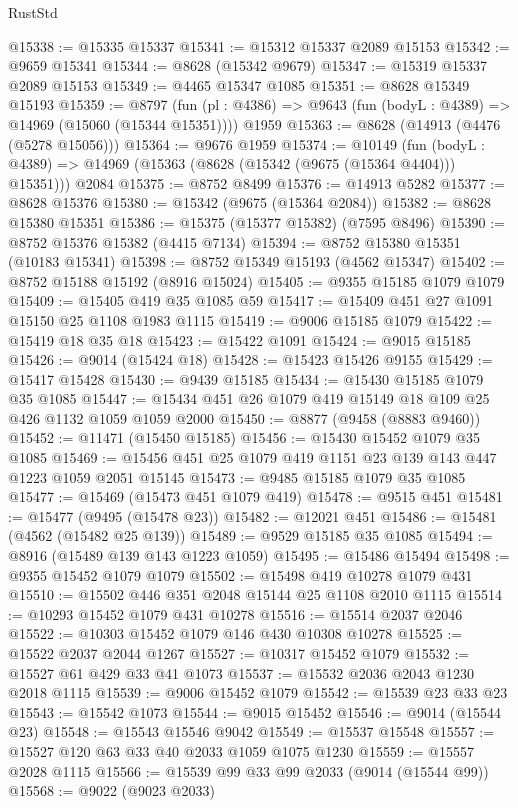 \begin{lexlean}{RustStd}
\begin{coremodule}
@15338 := @15335 @15337
@15341 := @15312 @15337 @2089 @15153
@15342 := @9659 @15341
@15344 := @8628 (@15342 @9679)
@15347 := @15319 @15337 @2089 @15153
@15349 := @4465 @15347 @1085
@15351 := @8628 @15349 @15193
@15359 := @8797
    (fun (pl : @4386) => @9643 (fun (bodyL : @4389) => @14969 (@15060 (@15344 @15351))))
    @1959
@15363 := @8628 (@14913 (@4476 (@5278 @15056)))
@15364 := @9676 @1959
@15374 := @10149
    (fun (bodyL : @4389) => @14969 (@15363 (@8628 (@15342 (@9675 (@15364 @4404))) @15351)))
    @2084
@15375 := @8752 @8499
@15376 := @14913 @5282
@15377 := @8628 @15376
@15380 := @15342 (@9675 (@15364 @2084))
@15382 := @8628 @15380 @15351
@15386 := @15375 (@15377 @15382) (@7595 @8496)
@15390 := @8752 @15376 @15382 (@4415 @7134)
@15394 := @8752 @15380 @15351 (@10183 @15341)
@15398 := @8752 @15349 @15193 (@4562 @15347)
@15402 := @8752 @15188 @15192 (@8916 @15024)
@15405 := @9355 @15185 @1079 @1079
@15409 := @15405 @419 @35 @1085 @59
@15417 := @15409 @451 @27 @1091 @15150 @25 @1108 @1983 @1115
@15419 := @9006 @15185 @1079
@15422 := @15419 @18 @35 @18
@15423 := @15422 @1091
@15424 := @9015 @15185
@15426 := @9014 (@15424 @18)
@15428 := @15423 @15426 @9155
@15429 := @15417 @15428
@15430 := @9439 @15185
@15434 := @15430 @15185 @1079 @35 @1085
@15447 := @15434 @451 @26 @1079 @419 @15149 @18 @109 @25 @426 @1132 @1059 @1059 @2000
@15450 := @8877 (@9458 (@8883 @9460))
@15452 := @11471 (@15450 @15185)
@15456 := @15430 @15452 @1079 @35 @1085
@15469 := @15456 @451 @25 @1079 @419 @1151 @23 @139 @143 @447 @1223 @1059 @2051 @15145
@15473 := @9485 @15185 @1079 @35 @1085
@15477 := @15469 (@15473 @451 @1079 @419)
@15478 := @9515 @451
@15481 := @15477 (@9495 (@15478 @23))
@15482 := @12021 @451
@15486 := @15481 (@4562 (@15482 @25 @139))
@15489 := @9529 @15185 @35 @1085
@15494 := @8916 (@15489 @139 @143 @1223 @1059)
@15495 := @15486 @15494
@15498 := @9355 @15452 @1079 @1079
@15502 := @15498 @419 @10278 @1079 @431
@15510 := @15502 @446 @351 @2048 @15144 @25 @1108 @2010 @1115
@15514 := @10293 @15452 @1079 @431 @10278
@15516 := @15514 @2037 @2046
@15522 := @10303 @15452 @1079 @146 @430 @10308 @10278
@15525 := @15522 @2037 @2044 @1267
@15527 := @10317 @15452 @1079
@15532 := @15527 @61 @429 @33 @41 @1073
@15537 := @15532 @2036 @2043 @1230 @2018 @1115
@15539 := @9006 @15452 @1079
@15542 := @15539 @23 @33 @23
@15543 := @15542 @1073
@15544 := @9015 @15452
@15546 := @9014 (@15544 @23)
@15548 := @15543 @15546 @9042
@15549 := @15537 @15548
@15557 := @15527 @120 @63 @33 @40 @2033 @1059 @1075 @1230
@15559 := @15557 @2028 @1115
@15566 := @15539 @99 @33 @99 @2033 (@9014 (@15544 @99))
@15568 := @9022 (@9023 @2033)

\end{coremodule}
\end{lexlean}
